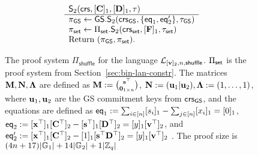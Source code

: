 \begin{figure}
\begin{\algSize}
$$\begin{array}{l}
\begin{array}{l}
\\
\end{array}
\\
\begin{array}{l}
{\mathsf{S}_2(\mathsf{crs},[\mathbf{{C}}]_1,[\mathbf{{D}}]_1,\tau)}\\
\hline
\pi_{\mathsf{GS}}\gets {\mathsf{GS}}.\mathsf{S}_2(\mathsf{crs}_{\mathsf{GS}},\{\mathsf{eq}_1,\mathsf{eq}'_2\},\tau_{\mathsf{GS}})\\
\pi_{\mathsf{set}}\gets \Pi_{\mathsf{set}}.\mathsf{S}_2(\mathsf{crs}_{\mathsf{set}},[\mathbf{{F}}]_1,\tau_{\mathsf{set}})\\
\text{Return }  (\pi_{\mathsf{GS}},\pi_{\mathsf{set}}).
\end{array}
\end{array}
$$
\end{\algSize}
\caption{The proof system $\Pi_\mathsf{shuffle}$ for the language $\mathcal{L}_{[\mathbf{v}]_2,n,\mathsf{shuffle}}$. $\Pi_{\mathsf{set}}$ is the proof system from Section~\ref{sec:bin-lan-constr}. The matrices $\mathbf{{M}},\mathbf{{N}},\mathbf{{\Lambda}}$ are defined as
$\mathbf{{M}}:=\binom{\mathbf{s}^\top}{\mathbf{{0}}_{1\times n}}$,
$\mathbf{{N}}:=(\mathbf{u}_1|\mathbf{u}_2),\mathbf{{\Lambda}}:= (1,\ldots,1)$, where $\mathbf{u}_1,\mathbf{u}_2$ are the GS commitment keys from $\mathsf{crs}_{\mathsf{GS}}$, and the equations are defined as $\mathsf{eq}_1:= \sum_{i\in[n]}[s_i]_1-\sum_{j\in[n]}[{x}_i]_1 = [0]_1$, $\mathsf{eq}_2:= [\mathbf{x}^\top]_1[\mathbf{{C}}^\top]_2-[\mathbf{s}^\top]_1[\mathbf{{D}}^\top]_2=[y]_1[\mathbf{v}^\top]_2$, and $\mathsf{eq}'_2:= [\mathbf{x}^\top]_1[\mathbf{{C}}^\top]_2-[1]_1[\mathbf{s}^\top\mathbf{{D}}^\top]_2=[y]_1[\mathbf{v}^\top]_2$   
. The proof size is $(4n+17)|\mathbb{G}_1|+14|\mathbb{G}_2|+1|\mathbb{Z}_q|$
\label{fig:shuffles}}
\end{figure}

